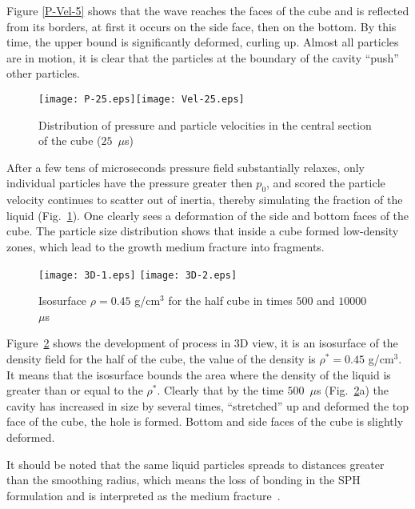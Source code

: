 \documentclass[a4paper]{jpconf}
\begin{document}
Figure \ref{P-Vel-5} shows that the wave reaches the faces of the cube and is reflected from its borders, at first it occurs on the side face, then on the bottom. By this time, the upper bound is significantly deformed, curling up. 
Almost all particles are in motion, it is clear that the particles at the boundary of the cavity ``push'' other particles.

\begin{figure}
\begin{center}
\texttt{[image: P-25.eps]}\texttt{[image: Vel-25.eps]}
\end{center}
\caption{\label{P-Vel-25} Distribution of pressure and particle velocities in the central section of the cube ($25$~$\mu$s)}
\end{figure}


After a few tens of microseconds pressure field substantially relaxes, only individual particles have the pressure greater then $p_0$, and scored the particle velocity continues to scatter out of inertia, thereby simulating the fraction of the liquid (Fig.~\ref{P-Vel-25}). One clearly sees a deformation of the side and bottom faces of the cube. The particle size distribution shows that inside a cube formed low-density zones, which lead to the growth medium fracture into fragments.

\begin{figure}
\begin{center}
\texttt{[image: 3D-1.eps]} \hfill \texttt{[image: 3D-2.eps]}
\end{center}
\caption{\label{3D-1} Isosurface $\rho=0.45$ g/cm$^3$ for the 
half cube in times $500$ and $10000$~$\mu$s}
\end{figure}

Figure~\ref{3D-1} shows 
the development of process in 3D view, it is an isosurface of the density field for the half of the cube, the value of the density is $\rho^* = 0.45$ g/cm$^3$. It means  that the isosurface bounds the area where the density of the liquid is greater than or equal to the $\rho^*$. Clearly that by the time $500$~$\mu$s (Fig.~\ref{3D-1}a) the cavity has increased in size by several times, ``stretched'' up and deformed the top face of the cube, the hole is formed. Bottom and side faces of the cube is slightly deformed. 


It should be noted that the same liquid particles spreads to distances greater than the smoothing radius, which means the loss of bonding in the SPH formulation and is interpreted as the medium fracture~\cite{DavydovKedrinskii2013}.
\end{document}

